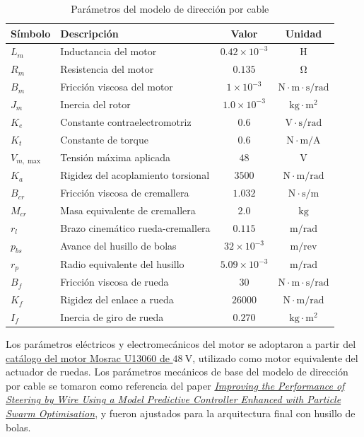 \documentclass{article}
\begin{document}
\begin{table}[H]
\small
\centering
\caption{Parámetros del modelo de dirección por cable}
\label{tab:parametros_modelo}
\begin{tabular}{l l c c}
\toprule
\textbf{Símbolo} & \textbf{Descripción} & \textbf{Valor} & \textbf{Unidad} \\
\midrule
$L_m$     & Inductancia del motor & $0.42 \times 10^{-3}$ & $\mathrm{H}$ \\
$R_m$     & Resistencia del motor & $0.135$   & $\mathrm{\Omega}$ \\
$B_m$     & Fricción viscosa del motor & $1 \times 10^{-3}$ & $\mathrm{N \cdot m \cdot s / rad}$ \\
$J_m$     & Inercia del rotor & $1.0 \times 10^{-3}$ & $\mathrm{kg \cdot m^2}$ \\
$K_e$     & Constante contraelectromotriz & $0.6$     & $\mathrm{V \cdot s / rad}$ \\
$K_t$     & Constante de torque & $0.6$     & $\mathrm{N \cdot m / A}$ \\
$V_{m,\max}$ & Tensión máxima aplicada & $48$   & $\mathrm{V}$ \\
\midrule
$K_a$     & Rigidez del acoplamiento torsional & $3500$    & $\mathrm{N \cdot m / rad}$ \\
\midrule
$B_{cr}$  & Fricción viscosa de cremallera & $1.032$   & $\mathrm{N \cdot s / m}$ \\
$M_{cr}$  & Masa equivalente de cremallera & $2.0$     & $\mathrm{kg}$ \\
$r_l$     & Brazo cinemático rueda-cremallera & $0.115$   & $\mathrm{m/rad}$ \\
$p_{bs}$  & Avance del husillo de bolas & $32 \times 10^{-3}$ & $\mathrm{m/rev}$ \\
$r_p$     & Radio equivalente del husillo & $5.09 \times 10^{-3}$ & $\mathrm{m/rad}$ \\
\midrule
$B_f$     & Fricción viscosa de rueda & $30$      & $\mathrm{N \cdot m \cdot s / rad}$ \\
$K_f$     & Rigidez del enlace a rueda & $26000$   & $\mathrm{N \cdot m / rad}$ \\
$I_f$     & Inercia de giro de rueda & $0.270$   & $\mathrm{kg \cdot m^2}$ \\
\bottomrule
\end{tabular}
\end{table}

Los parámetros eléctricos y electromecánicos del motor se adoptaron a partir del \hyperlink{ref:mosrac-u13060}{catálogo del motor Mosrac U13060 de $48\ \mathrm{V}$}, utilizado como motor equivalente del actuador de ruedas. Los parámetros mecánicos de base del modelo de dirección por cable se tomaron como referencia del paper \hyperlink{ref:taher-2025}{\textit{Improving the Performance of Steering by Wire Using a Model Predictive Controller Enhanced with Particle Swarm Optimisation}}, y fueron ajustados para la arquitectura final con husillo de bolas.
\end{document}
